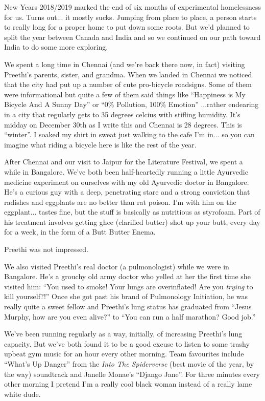 \documentclass{article}
\begin{document}
New Years 2018/2019 marked the end of six months of experimental homelessness for
us. Turns out... it mostly sucks. Jumping from place to place, a person starts to
really long for a proper home to put down some roots. But we'd planned to split the
year between Canada and India and so we continued on our path toward India to do some
more exploring.

We spent a long time in Chennai (and we're back there now, in fact) visiting
Preethi's parents, sister, and grandma. When we landed in Chennai we noticed that the city had
put up a number of cute pro-bicycle roadsigns. Some of them were informational but
quite a few of them said things like ``Happiness is My Bicycle And A Sunny Day'' or
``0\% Pollution, 100\% Emotion'' ...rather endearing in a city that regularly gets to
35 degrees celcius with stifling humidity. It's midday on December 30th as I write
this and Chennai is 28 degrees. This is ``winter''. I soaked my shirt in sweat just walking to the cafe
I'm in... so you can imagine what riding a bicycle here is like the rest of the year.

After Chennai and our visit to Jaipur for the Literature Festival, we spent a while
in Bangalore. We've both been half-heartedly running a little Ayurvedic medicine
experiment on ourselves with my old Ayurvedic doctor in Bangalore. He's a curious guy
with a deep, penetrating stare and a strong conviction that radishes and eggplants
are no better than rat poison. I'm with him on the eggplant... tastes fine, but the
stuff is basically as nutritious as styrofoam. Part of his treatment involves getting ghee (clarified
butter) shot up your butt, every day for a week, in the form of a Butt Butter Enema.

Preethi was not impressed.

We also visited Preethi's real doctor (a pulmonologist) while we were in
Bangalore. He's a grouchy old army doctor who yelled at her the first time she
visited him: ``You used to smoke! Your lungs are overinflated! Are you
\textit{trying} to kill yourself?!'' Once she got past his brand of Pulmonology
Initiation, he was really quite a sweet fellow and Preethi's lung status has
graduated from ``Jesus Murphy, how are you even alive?'' to ``You can run a half marathon? Good job.''

We've been running regularly as a way, initially, of increasing Preethi's lung
capacity. But we've both found it to be a good excuse to listen to some trashy upbeat
gym music for an hour every other morning. Team favourites include ``What's Up
Danger'' from the \textit{Into The Spiderverse} (best movie of the year, by the way)
soundtrack and Janelle Monae's ``Django Jane''. For three minutes every other morning
I pretend I'm a really cool black woman instead of a really lame white dude.
\end{document}
